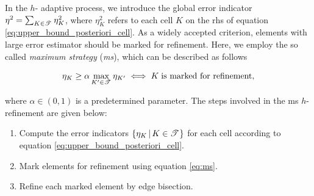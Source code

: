\documentclass[a4paper,11pt]{article}
\begin{document}
{In the $h$- adaptive process, we introduce the global error indicator $\eta^{2} = \sum_{K \in \mathscr T^{}} \eta_{K}^{2}$, where $\eta_{K}^{2}$ refers to each cell $K$ on the rhs of equation \eqref{eq:upper_bound_posteriori_cell}. As a widely accepted criterion, elements with large error estimator should be marked for refinement. Here, we employ the so called \textit{maximum strategy} (\textit{ms}), which can be described as follows

\begin{equation}
    \eta_{K} \geq \alpha \max_{K' \in \mathscr T^{}} \eta_{K'} \iff K \; \text{is marked for refinement},
\label{eq:ms}
\end{equation}

where $\alpha \in (0,1)$ is a predetermined parameter. The steps involved in the ms $h$-refinement are given below:

\begin{enumerate}
    \item Compute the error indicators $\{ \eta_{K} \, | \, K \in \mathscr T^{}  \}$ for each cell according to equation \eqref{eq:upper_bound_posteriori_cell}.

    \item Mark elements for refinement using equation \eqref{eq:ms}.
    
    \item Refine each marked element by edge bisection.
    
\end{enumerate}

}
\end{document}
